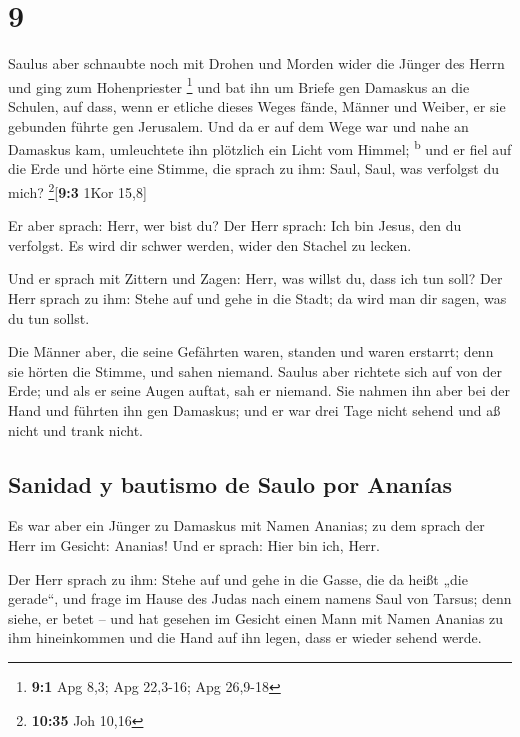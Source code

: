 \hypertarget{section-8}{%
\section{9}\label{section-8}}

 Saulus aber schnaubte noch mit Drohen und Morden wider
die Jünger des Herrn und ging zum Hohenpriester \footnote{\textbf{9:1}
  Apg 8,3; Apg 22,3-16; Apg 26,9-18}  und bat ihn um
Briefe gen Damaskus an die Schulen, auf dass, wenn er etliche dieses
Weges fände, Männer und Weiber, er sie gebunden führte gen Jerusalem.
 Und da er auf dem Wege war und nahe an Damaskus kam,
umleuchtete ihn plötzlich ein Licht vom Himmel; \textsuperscript{b}
 und er fiel auf die Erde und hörte eine Stimme, die
sprach zu ihm: Saul, Saul, was verfolgst du mich?
\footnote{\textbf{10:35} Joh 10,16}{[}\textbf{9:3} 1Kor 15,8{]}

 Er aber sprach: Herr, wer bist du? Der Herr sprach: Ich
bin Jesus, den du verfolgst. Es wird dir schwer werden, wider den
Stachel zu lecken.

 Und er sprach mit Zittern und Zagen: Herr, was willst du,
dass ich tun soll? Der Herr sprach zu ihm: Stehe auf und gehe in die
Stadt; da wird man dir sagen, was du tun sollst.

 Die Männer aber, die seine Gefährten waren, standen und
waren erstarrt; denn sie hörten die Stimme, und sahen niemand.
 Saulus aber richtete sich auf von der Erde; und als er
seine Augen auftat, sah er niemand. Sie nahmen ihn aber bei der Hand und
führten ihn gen Damaskus;  und er war drei Tage nicht
sehend und aß nicht und trank nicht.

\hypertarget{sanidad-y-bautismo-de-saulo-por-ananuxedas}{%
\subsection{Sanidad y bautismo de Saulo por
Ananías}\label{sanidad-y-bautismo-de-saulo-por-ananuxedas}}

 Es war aber ein Jünger zu Damaskus mit Namen Ananias; zu
dem sprach der Herr im Gesicht: Ananias! Und er sprach: Hier bin ich,
Herr.

 Der Herr sprach zu ihm: Stehe auf und gehe in die Gasse,
die da heißt „die gerade``, und frage im Hause des Judas nach einem
namens Saul von Tarsus; denn siehe, er betet --  und hat
gesehen im Gesicht einen Mann mit Namen Ananias zu ihm hineinkommen und
die Hand auf ihn legen, dass er wieder sehend werde.

